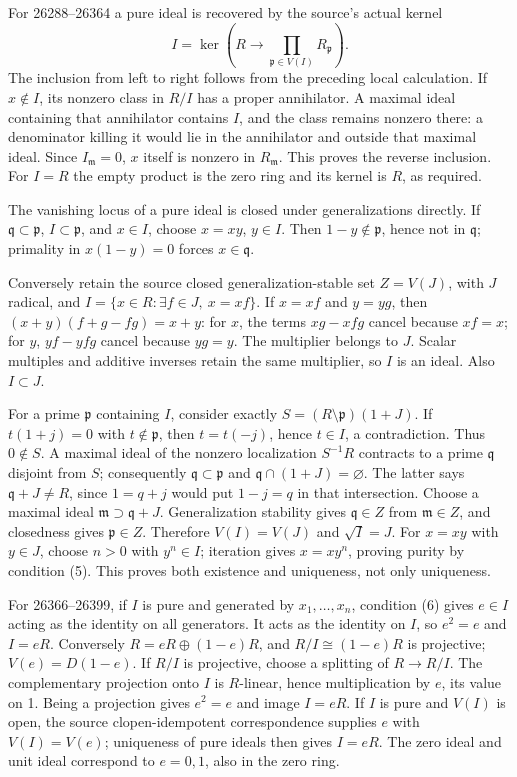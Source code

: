 For 26288--26364 a pure ideal is recovered by the source's actual kernel \[
I=\ker\left(R\longrightarrow\prod_{\mathfrak p\in V(I)}R_{\mathfrak p}\right).
\] The inclusion from left to right follows from the preceding local calculation. If \(x\notin I\), its nonzero class in \(R/I\) has a proper annihilator. A maximal ideal containing that annihilator contains \(I\), and the class remains nonzero there: a denominator killing it would lie in the annihilator and outside that maximal ideal. Since \(I_{\mathfrak m}=0\), \(x\) itself is nonzero in \(R_{\mathfrak m}\). This proves the reverse inclusion. For \(I=R\) the empty product is the zero ring and its kernel is \(R\), as required.

The vanishing locus of a pure ideal is closed under generalizations directly. If \(\mathfrak q\subset\mathfrak p\), \(I\subset\mathfrak p\), and \(x\in I\), choose \(x=xy\), \(y\in I\). Then \(1-y\notin\mathfrak p\), hence not in \(\mathfrak q\); primality in \(x(1-y)=0\) forces \(x\in\mathfrak q\).

Conversely retain the source closed generalization-stable set \(Z=V(J)\), with \(J\) radical, and \(I=\{x\in R:\exists f\in J,\ x=xf\}\). If \(x=xf\) and \(y=yg\), then \((x+y)(f+g-fg)=x+y\): for \(x\), the terms \(xg-xfg\) cancel because \(xf=x\); for \(y\), \(yf-yfg\) cancel because \(yg=y\). The multiplier belongs to \(J\). Scalar multiples and additive inverses retain the same multiplier, so \(I\) is an ideal. Also \(I\subset J\).

For a prime \(\mathfrak p\) containing \(I\), consider exactly \(S=(R\setminus\mathfrak p)(1+J)\). If \(t(1+j)=0\) with \(t\notin\mathfrak p\), then \(t=t(-j)\), hence \(t\in I\), a contradiction. Thus \(0\notin S\). A maximal ideal of the nonzero localization \(S^{-1}R\) contracts to a prime \(\mathfrak q\) disjoint from \(S\); consequently \(\mathfrak q\subset\mathfrak p\) and \(\mathfrak q\cap(1+J)=\varnothing\). The latter says \(\mathfrak q+J\ne R\), since \(1=q+j\) would put \(1-j=q\) in that intersection. Choose a maximal ideal \(\mathfrak m\supset\mathfrak q+J\). Generalization stability gives \(\mathfrak q\in Z\) from \(\mathfrak m\in Z\), and closedness gives \(\mathfrak p\in Z\). Therefore \(V(I)=V(J)\) and \(\sqrt I=J\). For \(x=xy\) with \(y\in J\), choose \(n>0\) with \(y^n\in I\); iteration gives \(x=xy^n\), proving purity by condition (5). This proves both existence and uniqueness, not only uniqueness.

For 26366--26399, if \(I\) is pure and generated by \(x_1,\ldots,x_n\), condition (6) gives \(e\in I\) acting as the identity on all generators. It acts as the identity on \(I\), so \(e^2=e\) and \(I=eR\). Conversely \(R=eR\oplus(1-e)R\), and \(R/I\cong(1-e)R\) is projective; \(V(e)=D(1-e)\). If \(R/I\) is projective, choose a splitting of \(R\to R/I\). The complementary projection onto \(I\) is \(R\)-linear, hence multiplication by \(e\), its value on 1. Being a projection gives \(e^2=e\) and image \(I=eR\). If \(I\) is pure and \(V(I)\) is open, the source clopen-idempotent correspondence supplies \(e\) with \(V(I)=V(e)\); uniqueness of pure ideals then gives \(I=eR\). The zero ideal and unit ideal correspond to \(e=0,1\), also in the zero ring.


